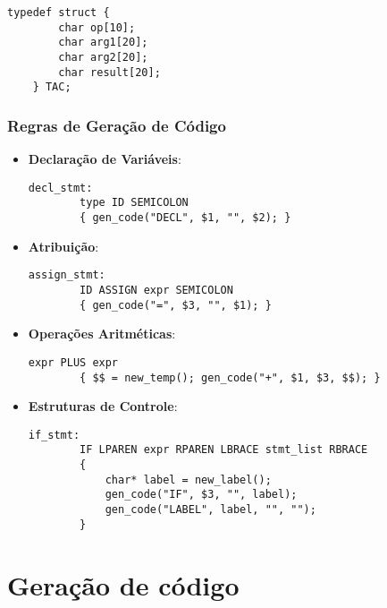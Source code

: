 \documentclass[10pt,twocolumn]{article}
\begin{document}
        \begin{lstlisting}[caption=Estrutura para geração de código,captionpos=b]
    typedef struct {
        char op[10]; 
        char arg1[20];   
        char arg2[20]; 
        char result[20];
    } TAC;
        \end{lstlisting}
    
    \subsubsection{Regras de Geração de Código}

        \begin{itemize}
            \item \textbf{Declaração de Variáveis}:
            \begin{lstlisting}[caption=Captura de variáveis,captionpos=b]
    decl_stmt:
        type ID SEMICOLON 
        { gen_code("DECL", $1, "", $2); }
            \end{lstlisting}

            \item \textbf{Atribuição}:
            \begin{lstlisting}[caption=Atribuição de variáveis,captionpos=b]
    assign_stmt: 
        ID ASSIGN expr SEMICOLON
        { gen_code("=", $3, "", $1); }
            \end{lstlisting}

            \item \textbf{Operações Aritméticas}:
            \begin{lstlisting}[caption=Operações aritméticas,captionpos=b]
    expr PLUS expr 
        { $$ = new_temp(); gen_code("+", $1, $3, $$); }
            \end{lstlisting}

            \item \textbf{Estruturas de Controle}:
            \begin{lstlisting}[caption=Estruturas de controle,captionpos=b]
    if_stmt:
        IF LPAREN expr RPAREN LBRACE stmt_list RBRACE
        {
            char* label = new_label();
            gen_code("IF", $3, "", label);
            gen_code("LABEL", label, "", "");
        }
            \end{lstlisting}
        \end{itemize}

\section{Geração de código}
\end{document}
